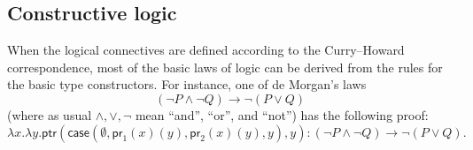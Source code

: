\documentclass[10pt]{article}
\def\case{\mathsf{case}}
\def\proj#1{\mathsf{pr}_{#1}}
\def\types{\vdash}
\numberwithin{equation}{section}
\begin{document}
\subsection{Constructive logic}
\label{sec:constructive-logic}

When the logical connectives are defined according to the Curry--Howard correspondence, most of the basic laws of logic can be derived from the rules for the basic type constructors.
For instance, one of de Morgan's laws
\[ (\neg P \land \neg Q) \to \neg(P\lor Q) \]
(where as usual $\land,\lor,\neg$ mean ``and'', ``or'', and ``not'') has the following proof:
\[ \lambda x.\lambda y. \mathsf{ptr}(\case(\emptyset,\proj1(x)(y),\proj2(x)(y),y),y) : (\neg P \land \neg Q) \to \neg(P\lor Q). \]
\end{document}
